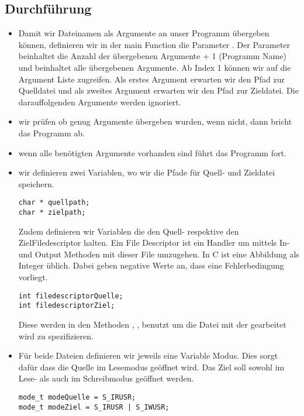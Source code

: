 	\subsection{Durchführung}
	\begin{itemize}
		\item Damit wir Dateinamen als Argumente an unser Programm übergeben können, definieren wir in der
		main Function die Parameter . Der Parameter
		 beinhaltet die Anzahl der übergebenen Argumente + 1 (Programm Name) und
		 beinhaltet alle übergebenen Argumente. Ab Index 1 können wir auf die Argument Liste
		zugreifen. Als erstes Argument erwarten wir den Pfad zur Quelldatei und als zweites Argument erwarten wir
	den Pfad zur Zieldatei. Die darauffolgenden Argumente werden ignoriert.
	\item wir prüfen ob genug Argumente übergeben wurden, wenn nicht, dann bricht das Programm ab.
	\item wenn alle benötigten Argumente vorhanden sind führt das Programm fort.
	\item wir definieren zwei Variablen, wo wir die Pfade für Quell- und Zieldatei speichern.
	\begin{lstlisting}
char * quellpath;
char * zielpath;
\end{lstlisting}


Zudem definieren wir Variablen die den Quell- respektive den ZielFiledescriptor halten.
Ein File Descriptor ist ein Handler um mittels In-und Output Methoden mit dieser
File umzugehen. In C ist eine Abbildung als Integer üblich. Dabei geben
negative Werte an, dass eine Fehlerbedingung vorliegt.
\begin{lstlisting}
int filedescriptorQuelle;
int filedescriptorZiel;
\end{lstlisting}

Diese werden in den Methoden , ,
 benutzt um die Datei mit der gearbeitet wird zu spezifizieren.

\item Für beide Dateien definieren wir jeweils eine Variable Modus.
Dies sorgt dafür dass die Quelle
im Lesemodus geöffnet wird.
Das Ziel soll sowohl im Lese- als auch im Schreibmodus geöffnet werden.

\begin{lstlisting}
mode_t modeQuelle = S_IRUSR;
mode_t modeZiel = S_IRUSR | S_IWUSR;
\end{lstlisting}


\end{itemize}
